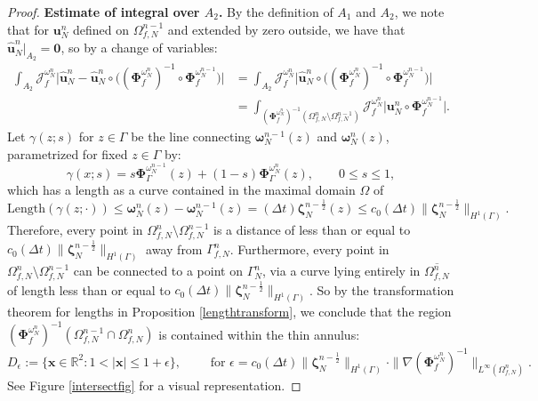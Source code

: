 \documentclass[11pt]{article}
\newcommand{\bd}{\boldsymbol}
\def\R{{\mathbb R}}
\theoremstyle{definition}
\begin{document}
\begin{proof}
\medskip

\noindent \textbf{Estimate of integral over $A_{2}$.} By the definition of $A_{1}$ and $A_{2}$, we note that for $\bd{u}^{n}_{N}$ defined on $\Omega^{n - 1}_{f, N}$ and extended by zero outside, we have that $\hat{\bd{u}}^{n}_{N}|_{A_{2}} = \bd{0}$, so by a change of variables:
\begin{align}\label{A2boundinterm}
\int_{A_{2}} \mathcal{J}^{\omega^{n}_{N}}_{f} \Big|\hat{\bd{u}}^{n}_{N} - \hat{\bd{u}}^{n}_{N} \circ \Big((\bd{\Phi}^{\omega^{n}_{N}}_{f})^{-1} \circ \bd{\Phi}^{\omega^{n - 1}_{N}}_{f}\Big)\Big| &= \int_{A_{2}} \mathcal{J}^{\omega^{n}_{N}}_{f} \Big|\hat{\bd{u}}^{n}_{N} \circ \Big((\bd{\Phi}^{\omega^{n}_{N}}_{f})^{-1} \circ \bd{\Phi}^{\omega^{n - 1}_{N}}_{f}\Big)\Big| \nonumber \\
&= \int_{\left(\bd{\Phi}^{\omega^{n}_{N}}_{f}\right)^{-1}(\Omega^{n}_{f, N} \setminus \Omega^{n - 1}_{f, N})} \mathcal{J}^{\omega^{n}_{N}}_{f} \Big|\bd{u}^{n}_{N} \circ \bd{\Phi}^{\omega^{n - 1}_{N}}_{f}\Big|.
\end{align}
Let $\gamma(z; s)$ for $z \in \Gamma$ be the line connecting $\bd{\omega}^{n - 1}_{N}(z)$ and $\bd{\omega}^{n}_{N}(z)$, parametrized for fixed $z \in \Gamma$ by:
\begin{equation*}
\gamma(x; s) = s \bd{\Phi}^{\omega^{n - 1}_{N}}_{\Gamma}(z) + (1 - s) \bd{\Phi}^{\omega^{n}_{N}}_{\Gamma}(z), \qquad 0 \le s \le 1,
\end{equation*}
which has a length as a curve contained in the maximal domain $\Omega$ of
\begin{equation}\label{lengthcalc1}
\text{Length}(\gamma(z; \cdot)) \le \bd{\omega}^{n}_{N}(z) - \bd{\omega}^{n - 1}_{N}(z) = (\Delta t) \bd{\zeta}^{n - \frac{1}{2}}_{N}(z) \le c_{0}(\Delta t)\|\bd{\zeta}^{n - \frac{1}{2}}_{N}\|_{H^{1}(\Gamma)}.
\end{equation}
Therefore, every point in $\Omega^{n}_{f, N} \setminus \Omega^{n - 1}_{f, N}$ is a distance of less than or equal to $c_{0}(\Delta t) \|\bd{\zeta}^{n - \frac{1}{2}}_{N}\|_{H^{1}(\Gamma)}$ away from $\Gamma^{n}_{f, N}$. Furthermore, every point in $\Omega^{n}_{f, N} \setminus \Omega^{n - 1}_{f, N}$ can be connected to a point on $\Gamma^{n}_{N}$, via a curve lying entirely in $\overline{\Omega^{n}_{f, N}}$ of length less than or equal to $c_{0}(\Delta t) \|\bd{\zeta}^{n - \frac{1}{2}}_{N}\|_{H^{1}(\Gamma)}$. So by the transformation theorem for lengths in Proposition \ref{lengthtransform}, we conclude that the region $(\bd{\Phi}^{\omega^{n}_{N}}_{f})^{-1}(\Omega^{n - 1}_{f, N} \cap \Omega^{n}_{f, N})$ is contained within the thin annulus:
\begin{equation*}
D_{\epsilon} := \{\bd{x} \in \R^{2} : 1 < |\bd{x}| \le 1 + \epsilon \}, \qquad \text{ for } \epsilon = c_{0} (\Delta t) \|\bd{\zeta}^{n - \frac{1}{2}}_{N}\|_{H^{1}(\Gamma)} \cdot \|\nabla (\bd{\Phi}^{\omega^{n}_{N}}_{f})^{-1}\|_{L^{\infty}(\Omega^{n}_{f, N})}.
\end{equation*}
See Figure \ref{intersectfig} for a visual representation.


\end{proof}
\end{document}
